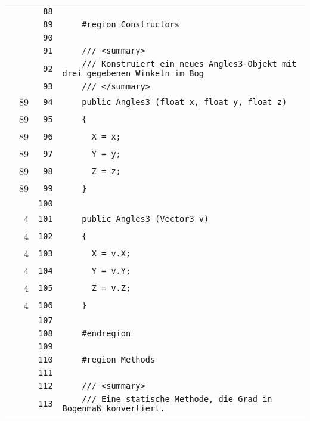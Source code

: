 \documentclass[a4paper,10pt]{article}
\begin{document}
\begin{longtable}[l]{lrrl}
\cellcolor{gray} &  & \verb~88~ & \verb~~\\
\cellcolor{gray} &  & \verb~89~ & \verb~    #region Constructors~\\
\cellcolor{gray} &  & \verb~90~ & \verb~~\\
\cellcolor{gray} &  & \verb~91~ & \verb~    /// <summary>~\\
\cellcolor{gray} &  & \verb~92~ & \verb~    /// Konstruiert ein neues Angles3-Objekt mit drei gegebenen Winkeln im Bog~\\
\cellcolor{gray} &  & \verb~93~ & \verb~    /// </summary>~\\
\cellcolor{green} & 89 & \verb~94~ & \verb~    public Angles3 (float x, float y, float z)~\\
\cellcolor{green} & 89 & \verb~95~ & \verb~    {~\\
\cellcolor{green} & 89 & \verb~96~ & \verb~      X = x;~\\
\cellcolor{green} & 89 & \verb~97~ & \verb~      Y = y;~\\
\cellcolor{green} & 89 & \verb~98~ & \verb~      Z = z;~\\
\cellcolor{green} & 89 & \verb~99~ & \verb~    }~\\
\cellcolor{gray} &  & \verb~100~ & \verb~~\\
\cellcolor{green} & 4 & \verb~101~ & \verb~    public Angles3 (Vector3 v)~\\
\cellcolor{green} & 4 & \verb~102~ & \verb~    {~\\
\cellcolor{green} & 4 & \verb~103~ & \verb~      X = v.X;~\\
\cellcolor{green} & 4 & \verb~104~ & \verb~      Y = v.Y;~\\
\cellcolor{green} & 4 & \verb~105~ & \verb~      Z = v.Z;~\\
\cellcolor{green} & 4 & \verb~106~ & \verb~    }~\\
\cellcolor{gray} &  & \verb~107~ & \verb~~\\
\cellcolor{gray} &  & \verb~108~ & \verb~    #endregion~\\
\cellcolor{gray} &  & \verb~109~ & \verb~~\\
\cellcolor{gray} &  & \verb~110~ & \verb~    #region Methods~\\
\cellcolor{gray} &  & \verb~111~ & \verb~~\\
\cellcolor{gray} &  & \verb~112~ & \verb~    /// <summary>~\\
\cellcolor{gray} &  & \verb~113~ & \verb~    /// Eine statische Methode, die Grad in Bogenmaß konvertiert.~\\

\end{longtable}
\end{document}
